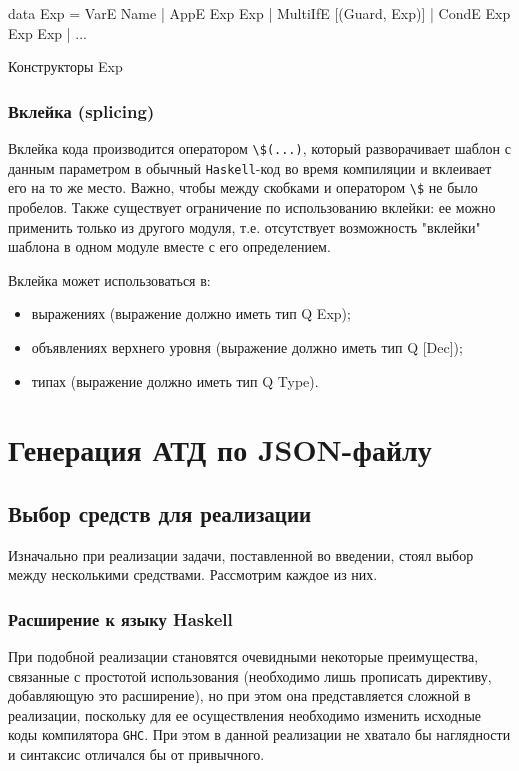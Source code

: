 \begin{ListingEnv}[H]
\begin{Verb}
data Exp
       = VarE Name
       | AppE Exp Exp
       | MultiIfE [(Guard, Exp)]
       | CondE Exp Exp Exp
       | ...
\end{Verb}
\caption{Конструкторы Exp}
\label{listing:expConstr}
\end{ListingEnv}

\subsection{Вклейка (splicing)}

Вклейка кода производится оператором  \lstinline{\$(...)}, который разворачивает шаблон с данным параметром в обычный \lstinline{Haskell}-код во время компиляции и вклеивает его на то же место. Важно, чтобы между скобками и оператором \lstinline{\$} не было пробелов. Также существует ограничение по использованию вклейки: ее можно применить только из другого модуля, т.е. отсутствует возможность "вклейки" шаблона в одном модуле вместе с его определением.

Вклейка может использоваться в:

\begin{itemize}
  \item выражениях (выражение должно иметь тип Q Exp);
  \item объявлениях верхнего уровня (выражение должно иметь тип Q [Dec]);
  \item типах (выражение должно иметь тип Q Type).
\end{itemize}

\chapter{Генерация АТД по JSON-файлу}

\section{Выбор средств для реализации}

Изначально при реализации задачи, поставленной во введении, стоял выбор между несколькими средствами. Рассмотрим каждое из них.

\subsection{Расширение к языку Haskell}

При подобной реализации становятся очевидными некоторые преимущества, связанные с простотой использования (необходимо лишь прописать директиву, добавляющую это расширение), но при этом она представляется сложной в реализации, поскольку для ее осуществления необходимо изменить исходные коды компилятора  \lstinline{GHC}. При этом в данной реализации не хватало бы наглядности и синтаксис отличался бы от привычного.

